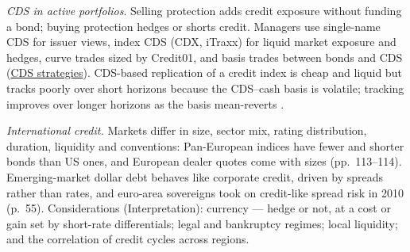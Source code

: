 \begin{qfmethod}\label{meth:credit-cds-international-structured}
 \emph{CDS in active portfolios}. Selling protection adds credit exposure without funding a bond; buying protection hedges or shorts credit. Managers use single-name CDS for issuer views, index CDS (CDX, iTraxx) for liquid market exposure and hedges, curve trades sized by Credit01, and basis trades between bonds and CDS (\hyperref[meth:cds-strategies]{CDS strategies}). CDS-based replication of a credit index is cheap and liquid but tracks poorly over short horizons because the CDS--cash basis is volatile; tracking improves over longer horizons as the basis mean-reverts \citep[pp.~337--338]{ben-dor-credit-portfolio-2012}.

\emph{International credit.} Markets differ in size, sector mix, rating distribution, duration, liquidity and conventions: Pan-European indices have fewer and shorter bonds than US ones, and European dealer quotes come with sizes (pp.~113--114). Emerging-market dollar debt behaves like corporate credit, driven by spreads rather than rates, and euro-area sovereigns took on credit-like spread risk in 2010 (p.~55). Considerations (Interpretation): currency --- hedge or not, at a cost or gain set by short-rate differentials; legal and bankruptcy regimes; local liquidity; and the correlation of credit cycles across regions.


\end{qfmethod}
